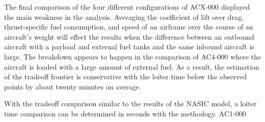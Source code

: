 The final comparison of the four different configurations of ACX-000 displayed the main weakness in the analysis. Averaging the coefficient of lift over drag, thrust-specific fuel consumption, and speed of an airframe over the course of an aircraft's weight will effect the results when the difference between an outbound aircraft with a payload and external fuel tanks and the same inbound aircraft is large. The breakdown appears to happen in the comparison of AC4-000 where the aircraft is loaded with a large amount of external fuel. As a result, the estimation of the tradeoff frontier is conservative with the loiter time below the observed points by about twenty minutes on average. \par
With the tradeoff comparison similar to the results of the NASIC model, a loiter time comparison can be determined in seconds with the methodogy. AC1-000